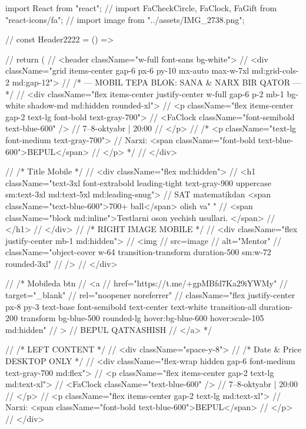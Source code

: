 import React from "react";
// import { FaCheckCircle, FaClock, FaGift } from "react-icons/fa";
// import image from "../assets/IMG_2738.png";

// const Header2222 = () => {
//     return (
//         <header className="w-full font-sans bg-white">
//             <div className="grid items-center gap-6 px-6 py-10 mx-auto max-w-7xl md:grid-cols-2 md:gap-12">
//                 {/* --- MOBIL TEPA BLOK: SANA & NARX BIR QATOR --- */}
//                 <div className="flex items-center justify-center w-full gap-6 p-2 mb-1 bg-white shadow-md md:hidden rounded-xl">
//                     <p className="flex items-center gap-2 text-lg font-bold text-gray-700">
//                         <FaClock className="font-semibold text-blue-600" />
//                         7–8-oktyabr | 20:00
//                     </p>
//                     {/* <p className="text-lg font-medium text-gray-700">
//                         Narxi: <span className="font-bold text-blue-600">BEPUL</span>
//                     </p> */}
//                 </div>

//                 {/* Title Mobile */}
//                 <div className="flex md:hidden">
//                     <h1 className="text-3xl font-extrabold leading-tight text-gray-900 uppercase sm:text-3xl md:text-5xl md:leading-snug">
//                         SAT matematikdan <span className="text-blue-600">700+ ball</span> olish va{" "}
//                         <span className="block md:inline">Testlarni oson yechish usullari. </span>
//                     </h1>
//                 </div>
//                 {/* RIGHT IMAGE MOBILE */}
//                 <div className="flex justify-center mb-1 md:hidden">
//                     <img
//                         src={image}
//                         alt="Mentor"
//                         className="object-cover w-64 transition-transform duration-500 sm:w-72 rounded-3xl"
//                     />
//                 </div>

//                 {/* Mobileda btn
//                 <a
//                     href="https://t.me/+gpMBfd7Ka29iYWMy"
//                     target="_blank"
//                     rel="noopener noreferrer"
//                     className="flex justify-center px-8 py-3 text-base font-semibold text-center text-white transition-all duration-200 transform bg-blue-500 rounded-lg hover:bg-blue-600 hover:scale-105 md:hidden"
//                 >
//                     BEPUL QATNASHISH
//                 </a> */}

//                 {/* LEFT CONTENT */}
//                 <div className="space-y-8">
//                     {/* Date & Price DESKTOP ONLY */}
//                     <div className="flex-wrap hidden gap-6 font-medium text-gray-700 md:flex">
//                         <p className="flex items-center gap-2 text-lg md:text-xl">
//                             <FaClock className="text-blue-600" />
//                             7–8-oktyabr | 20:00
//                         </p>
//                         <p className="flex items-center gap-2 text-lg md:text-xl">
//                             Narxi: <span className="font-bold text-blue-600">BEPUL</span>
//                         </p>
//                     </div>

}

